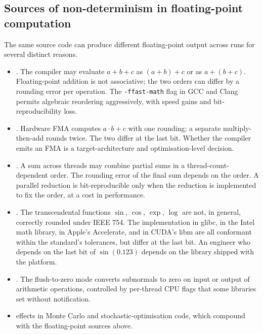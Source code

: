 \subsection{Sources of non-determinism in floating-point computation}

The same source code can produce different floating-point output
across runs for several distinct reasons.

\begin{itemize}[leftmargin=*]
  \item {}. The compiler may evaluate
    $a + b + c$ as $(a + b) + c$ or as $a + (b + c)$. Floating-point
    addition is not associative; the two orders can differ by a
    rounding error per operation. The \texttt{-ffast-math} flag in
    GCC and Clang permits algebraic reordering aggressively, with
    speed gains and bit-reproducibility loss.
  \item {}. Hardware FMA computes
    $a \cdot b + c$ with one rounding; a separate multiply-then-add
    rounds twice. The two differ at the last bit. Whether the
    compiler emits an FMA is a target-architecture and
    optimisation-level decision.
  \item {}. A sum across threads may
    combine partial sums in a thread-count-dependent order. The
    rounding error of the final sum depends on the order. A
    parallel reduction is bit-reproducible only when the reduction
    is implemented to fix the order, at a cost in performance.
  \item {}. The transcendental
    functions $\sin$, $\cos$, $\exp$, $\log$ are not, in general,
    correctly rounded under IEEE 754. The implementation in
    glibc, in the Intel math library, in Apple's Accelerate, and
    in CUDA's libm are all conformant within the standard's
    tolerances, but differ at the last bit. An engineer who
    depends on the last bit of $\sin(0.123)$ depends on the
    library shipped with the platform.
  \item {}. The flush-to-zero mode
    converts subnormals to zero on input or output of arithmetic
    operations, controlled by per-thread CPU flags that some
    libraries set without notification.
  \item {} effects in
    Monte Carlo and stochastic-optimisation code, which compound
    with the floating-point sources above.
\end{itemize}

